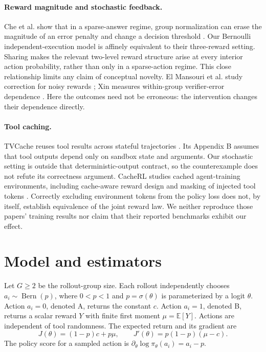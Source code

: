 \documentclass[10pt,letterpaper]{article}
\newcommand{\E}{\mathbb{E}}
\newcommand{\Bern}{\operatorname{Bern}}
\begin{document}
\paragraph{Reward magnitude and stochastic feedback.}
Che et al. show that in a sparse-answer regime, group normalization can erase
the magnitude of an error penalty and change a decision threshold \cite{che}.
Our Bernoulli independent-execution model is affinely equivalent to their three-reward
setting. Sharing makes the relevant two-level reward structure arise at every
interior action probability, rather than only in a sparse-action regime. This
close relationship limits any claim of conceptual novelty. El Mansouri et al.
study correction for noisy rewards \cite{noisecorrected}; Xin measures
within-group verifier-error dependence \cite{xin}. Here the outcomes need not
be erroneous: the intervention changes their dependence directly.

\paragraph{Tool caching.}
TVCache reuses tool results across stateful trajectories \cite{tvcache}. Its
Appendix B assumes that tool outputs depend only on sandbox state and arguments.
Our stochastic setting is outside that deterministic-output contract, so the
counterexample does not refute its correctness argument. CacheRL studies cached
agent-training environments, including cache-aware reward design and masking
of injected tool tokens \cite{cacherl}. Correctly excluding environment tokens
from the policy loss does not, by itself, establish equivalence of the joint
reward law. We neither reproduce those papers' training results nor claim that
their reported benchmarks exhibit our effect.

\section{Model and estimators}
Let $G\geq2$ be the rollout-group size. Each rollout independently chooses
$a_i\sim\Bern(p)$, where $0<p<1$ and $p=\sigma(\theta)$ is parameterized by a
logit $\theta$. Action $a_i=0$, denoted A, returns the constant $c$. Action
$a_i=1$, denoted B, returns a scalar reward $Y$ with finite first moment
$\mu=\E[Y]$. Actions are independent of tool randomness. The expected return
and its gradient are
\begin{equation}
J(\theta)=(1-p)c+p\mu,\qquad
J'(\theta)=p(1-p)(\mu-c).
\label{eq:target}
\end{equation}
The policy score for a sampled action is $\partial_\theta\log\pi_\theta(a_i)=a_i-p$.
\end{document}
